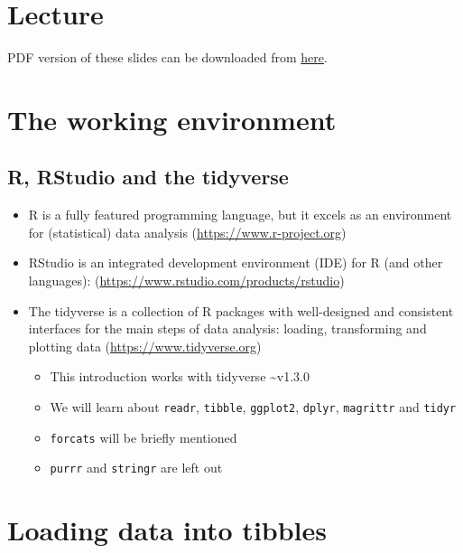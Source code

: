 \documentclass[
  letterpaper,
]{book}
\providecommand{\tightlist}{%
  \setlength{\itemsep}{0pt}\setlength{\parskip}{0pt}}\usepackage{longtable,booktabs,array}
\begin{document}
\hypertarget{lecture-6}{%
\section{Lecture}\label{lecture-6}}

PDF version of these slides can be downloaded from
\href{https://github.com/nevrome/spaam_r_tidyverse_intro_2h/raw/main/presentation.pdf}{here}.

\hypertarget{the-working-environment}{%
\section{The working environment}\label{the-working-environment}}

\hypertarget{r-rstudio-and-the-tidyverse}{%
\subsection{R, RStudio and the
tidyverse}\label{r-rstudio-and-the-tidyverse}}

\begin{itemize}
\item
  R is a fully featured programming language, but it excels as an
  environment for (statistical) data analysis
  (\url{https://www.r-project.org})
\item
  RStudio is an integrated development environment (IDE) for R (and
  other languages): (\url{https://www.rstudio.com/products/rstudio})
\item
  The tidyverse is a collection of R packages with well-designed and
  consistent interfaces for the main steps of data analysis: loading,
  transforming and plotting data (\url{https://www.tidyverse.org})

  \begin{itemize}
  \tightlist
  \item
    This introduction works with tidyverse \textasciitilde v1.3.0
  \item
    We will learn about \texttt{readr}, \texttt{tibble},
    \texttt{ggplot2}, \texttt{dplyr}, \texttt{magrittr} and
    \texttt{tidyr}
  \item
    \texttt{forcats} will be briefly mentioned
  \item
    \texttt{purrr} and \texttt{stringr} are left out
  \end{itemize}
\end{itemize}

\hypertarget{loading-data-into-tibbles}{%
\section{Loading data into tibbles}\label{loading-data-into-tibbles}}
\end{document}
